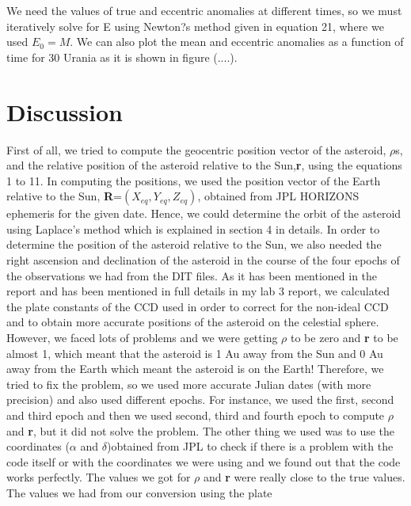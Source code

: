 \documentclass[letterpaper,12pt]{article}
\begin{document}
We need the values of true and eccentric anomalies at different times, so we must iteratively solve for E using Newton?s method given in equation 21, where we used \begin{math} E_{0}=M \end{math}. We can also plot the mean and eccentric anomalies as a function of time for 30 Urania as it is shown in figure (....).





\section{Discussion}
\label{sec:discussion}
First of all, we tried to compute the geocentric position vector of the asteroid, \begin{math} \rho \end{math}s, and the relative position of the asteroid relative to the Sun,{\bf r}, using the equations 1 to 11. In computing the positions, we used the position vector of the Earth relative to the Sun, {\bf R}=\begin{math} (X_{eq},Y_{eq},Z_{eq})\end{math}, obtained from JPL HORIZONS ephemeris for the given date. Hence, we could determine the orbit of the asteroid using Laplace's method which is explained in section 4 in details. In order to determine the position of the asteroid relative to the Sun, we also needed the right ascension and declination of the asteroid in the course of the four epochs of the observations we had from the DIT files. As it has been mentioned in the report and has been mentioned in full details in my lab 3 report, we calculated the plate constants of the CCD used in order to correct for the non-ideal CCD and to obtain more accurate positions of the asteroid on the celestial sphere. However, we faced lots of problems and we were getting \begin{math} \rho \end{math} to be zero and {\bf r} to be almost 1, which meant that the asteroid is 1 Au away from the Sun and 0 Au away from the Earth which meant the asteroid is on the Earth! Therefore, we tried to fix the problem, so we used more accurate Julian dates (with more precision) and also used different epochs. For instance, we used the first, second and third epoch and then we used second, third and fourth epoch to compute \begin{math} \rho \end{math} and {\bf r}, but it did not solve the problem. The other thing we used was to use the coordinates (\begin{math} \alpha \end{math} and \begin{math} \delta \end{math})obtained from JPL to check if there is a problem with the code itself or with the coordinates we were using and we found out that the code works perfectly. The values we got for \begin{math} \rho \end{math} and {\bf r} were really close to the true values. The values we had from our conversion using the plate 
\end{document}

